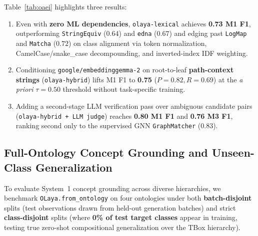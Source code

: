 \documentclass[11pt,a4paper]{article}
\begin{document}
Table~\ref{tab:oaei} highlights three results:
\begin{enumerate}[leftmargin=1.8em,itemsep=0.2em]
  \item Even with \textbf{zero ML dependencies}, \texttt{olaya-lexical} achieves \textbf{0.73 M1 F1}, outperforming \texttt{StringEquiv} ($0.64$) and \texttt{edna} ($0.67$) and edging past \texttt{LogMap} and \texttt{Matcha} ($0.72$) on class alignment via token normalization, CamelCase/snake\_case decompounding, and inverted-index IDF weighting.
  \item Conditioning \texttt{google/embeddinggemma-2} on root-to-leaf \textbf{path-context strings} (\texttt{olaya-hybrid}) lifts M1 F1 to \textbf{0.75} ($P = 0.82, R = 0.69$) at the \emph{a priori} $\tau = 0.50$ threshold without task-specific training.
  \item Adding a second-stage LLM verification pass over ambiguous candidate pairs (\texttt{olaya-hybrid + LLM judge}) reaches \textbf{0.80 M1 F1} and \textbf{0.76 M3 F1}, ranking second only to the supervised GNN \texttt{GraphMatcher} ($0.83$).
\end{enumerate}

\subsection{Full-Ontology Concept Grounding and Unseen-Class Generalization}

To evaluate System~1 concept grounding across diverse hierarchies, we benchmark \texttt{OLaya.from\_ontology} on four ontologies under both \textbf{batch-disjoint} splits (test observations drawn from held-out generation batches) and strict \textbf{class-disjoint} splits (where \textbf{0\% of test target classes} appear in training, testing true zero-shot compositional generalization over the TBox hierarchy).
\end{document}
